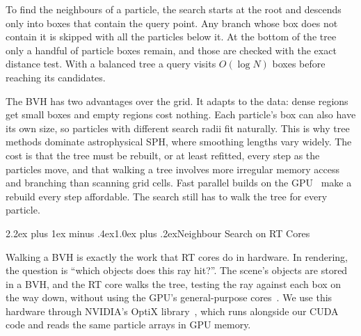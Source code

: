\documentclass[conference]{IEEEtran}
\makeatletter
\renewcommand\section{\@startsection{section}{1}{\z@}%
  {2.2ex plus 1ex minus .4ex}{1.0ex plus .2ex}{\normalfont\large\bfseries}}
\makeatother
\begin{document}
To find the neighbours of a particle, the search starts at the root and descends only into boxes that contain the query point. Any branch whose box does not contain it is skipped with all the particles below it. At the bottom of the tree only a handful of particle boxes remain, and those are checked with the exact distance test. With a balanced tree a query visits $O(\log N)$ boxes before reaching its candidates.

The BVH has two advantages over the grid. It adapts to the data: dense regions get small boxes and empty regions cost nothing. Each particle's box can also have its own size, so particles with different search radii fit naturally. This is why tree methods dominate astrophysical SPH, where smoothing lengths vary widely. The cost is that the tree must be rebuilt, or at least refitted, every step as the particles move, and that walking a tree involves more irregular memory access and branching than scanning grid cells. Fast parallel builds on the GPU~\cite{karras2012lbvh} make a rebuild every step affordable. The search still has to walk the tree for every particle.

\section{Neighbour Search on RT Cores}\label{sec:rt}

Walking a BVH is exactly the work that RT cores do in hardware. In rendering, the question is ``which objects does this ray hit?''. The scene's objects are stored in a BVH, and the RT core walks the tree, testing the ray against each box on the way down, without using the GPU's general-purpose cores~\cite{nvidia2018turing}. We use this hardware through NVIDIA's OptiX library~\cite{parker2010optix}, which runs alongside our CUDA code and reads the same particle arrays in GPU memory.
\end{document}
